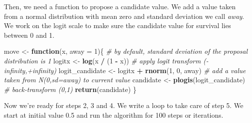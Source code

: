 \documentclass[
  12pt,
]{krantz}
\newenvironment{Shaded}{\begin{snugshade}}{\end{snugshade}}
\newcommand{\AttributeTok}[1]{\textcolor[rgb]{0.13,0.29,0.53}{#1}}
\newcommand{\CommentTok}[1]{\textcolor[rgb]{0.56,0.35,0.01}{\textit{#1}}}
\newcommand{\ControlFlowTok}[1]{\textcolor[rgb]{0.13,0.29,0.53}{\textbf{#1}}}
\newcommand{\DecValTok}[1]{\textcolor[rgb]{0.00,0.00,0.81}{#1}}
\newcommand{\FunctionTok}[1]{\textcolor[rgb]{0.13,0.29,0.53}{\textbf{#1}}}
\newcommand{\NormalTok}[1]{#1}
\newcommand{\OtherTok}[1]{\textcolor[rgb]{0.56,0.35,0.01}{#1}}
\newcommand{\SpecialCharTok}[1]{\textcolor[rgb]{0.81,0.36,0.00}{\textbf{#1}}}
\begin{document}
Then, we need a function to propose a candidate value. We add a value taken from a normal distribution with mean zero and standard deviation we call \emph{away}. We work on the logit scale to make sure the candidate value for survival lies between 0 and 1.

\begin{Shaded}
\begin{Highlighting}[]
\NormalTok{move }\OtherTok{\textless{}{-}} \ControlFlowTok{function}\NormalTok{(x, }\AttributeTok{away =} \DecValTok{1}\NormalTok{)\{ }\CommentTok{\# by default, standard deviation of the proposal distribution is 1}
\NormalTok{  logitx }\OtherTok{\textless{}{-}} \FunctionTok{log}\NormalTok{(x }\SpecialCharTok{/}\NormalTok{ (}\DecValTok{1} \SpecialCharTok{{-}}\NormalTok{ x)) }\CommentTok{\# apply logit transform ({-}infinity,+infinity)}
\NormalTok{  logit\_candidate }\OtherTok{\textless{}{-}}\NormalTok{ logitx }\SpecialCharTok{+} \FunctionTok{rnorm}\NormalTok{(}\DecValTok{1}\NormalTok{, }\DecValTok{0}\NormalTok{, away) }\CommentTok{\# add a value taken from N(0,sd=away) to current value}
\NormalTok{  candidate }\OtherTok{\textless{}{-}} \FunctionTok{plogis}\NormalTok{(logit\_candidate) }\CommentTok{\# back{-}transform (0,1)}
  \FunctionTok{return}\NormalTok{(candidate)}
\NormalTok{\}}
\end{Highlighting}
\end{Shaded}

Now we're ready for steps 2, 3 and 4. We write a loop to take care of step 5. We start at initial value 0.5 and run the algorithm for 100 steps or iterations.
\end{document}
